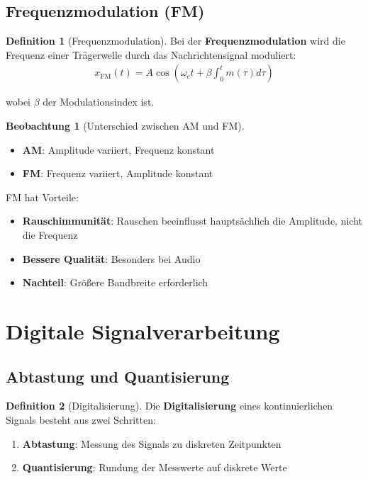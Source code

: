 ﻿\documentclass[a4paper,12pt]{report}
\theoremstyle{definition}
\newtheorem{definition}{Definition}
\newtheorem{beobachtung}{Beobachtung}
\begin{document}
	\subsection{Frequenzmodulation (FM)}
	
	\begin{definition}[Frequenzmodulation]
		Bei der \textbf{Frequenzmodulation} wird die Frequenz einer Trägerwelle durch das Nachrichtensignal moduliert:
		\begin{align}
			x_{\text{FM}}(t) = A \cos\left(\omega_c t + \beta \int_0^t m(\tau) d\tau\right)
		\end{align}
		
		wobei $\beta$ der Modulationsindex ist.
	\end{definition}
	
	\begin{beobachtung}[Unterschied zwischen AM und FM]
		\begin{itemize}
			\item[-] \textbf{AM}: Amplitude variiert, Frequenz konstant
			\item[-] \textbf{FM}: Frequenz variiert, Amplitude konstant
		\end{itemize}
		
		FM hat Vorteile:
		\begin{itemize}
			\item[-] \textbf{Rauschimmunität}: Rauschen beeinflusst hauptsächlich die Amplitude, nicht die Frequenz
			\item[-] \textbf{Bessere Qualität}: Besonders bei Audio
			\item[-] \textbf{Nachteil}: Größere Bandbreite erforderlich
		\end{itemize}
	\end{beobachtung}
	
	\section{Digitale Signalverarbeitung}
	
	\subsection{Abtastung und Quantisierung}
	
	\begin{definition}[Digitalisierung]
		Die \textbf{Digitalisierung} eines kontinuierlichen Signals besteht aus zwei Schritten:
		\begin{enumerate}
			\item[-] \textbf{Abtastung}: Messung des Signals zu diskreten Zeitpunkten
			\item[-] \textbf{Quantisierung}: Rundung der Messwerte auf diskrete Werte
		\end{enumerate}
	\end{definition}
	
\end{document}
